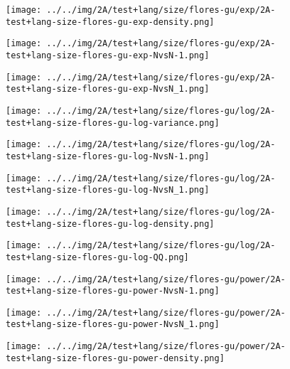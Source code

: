 \begin{figure}[H]
\centering	\texttt{[image: ../../img/2A/test+lang/size/flores-gu/exp/2A-test+lang-size-flores-gu-exp-density.png]}
\end{figure}
\begin{figure}[H]
\centering	\texttt{[image: ../../img/2A/test+lang/size/flores-gu/exp/2A-test+lang-size-flores-gu-exp-NvsN-1.png]}
\end{figure}
\begin{figure}[H]
\centering	\texttt{[image: ../../img/2A/test+lang/size/flores-gu/exp/2A-test+lang-size-flores-gu-exp-NvsN\_1.png]}
\end{figure}
\begin{figure}[H]
\centering	\texttt{[image: ../../img/2A/test+lang/size/flores-gu/log/2A-test+lang-size-flores-gu-log-variance.png]}
\end{figure}
\begin{figure}[H]
\centering	\texttt{[image: ../../img/2A/test+lang/size/flores-gu/log/2A-test+lang-size-flores-gu-log-NvsN-1.png]}
\end{figure}
\begin{figure}[H]
\centering	\texttt{[image: ../../img/2A/test+lang/size/flores-gu/log/2A-test+lang-size-flores-gu-log-NvsN\_1.png]}
\end{figure}
\begin{figure}[H]
\centering	\texttt{[image: ../../img/2A/test+lang/size/flores-gu/log/2A-test+lang-size-flores-gu-log-density.png]}
\end{figure}
\begin{figure}[H]
\centering	\texttt{[image: ../../img/2A/test+lang/size/flores-gu/log/2A-test+lang-size-flores-gu-log-QQ.png]}
\end{figure}
\begin{figure}[H]
\centering	\texttt{[image: ../../img/2A/test+lang/size/flores-gu/power/2A-test+lang-size-flores-gu-power-NvsN-1.png]}
\end{figure}
\begin{figure}[H]
\centering	\texttt{[image: ../../img/2A/test+lang/size/flores-gu/power/2A-test+lang-size-flores-gu-power-NvsN\_1.png]}
\end{figure}
\begin{figure}[H]
\centering	\texttt{[image: ../../img/2A/test+lang/size/flores-gu/power/2A-test+lang-size-flores-gu-power-density.png]}
\end{figure}
